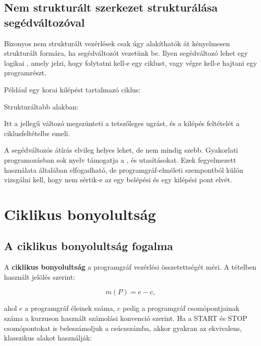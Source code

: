 \subsection{Nem strukturált szerkezet strukturálása segédváltozóval}

Bizonyos nem strukturált vezérlések csak úgy alakíthatók át kényelmesen strukturált formára, ha segédváltozót vezetünk be. Ilyen segédváltozó lehet egy logikai , amely jelzi, hogy folytatni kell-e egy ciklust, vagy végre kell-e hajtani egy programrészt.

Például egy korai kilépést tartalmazó ciklus:


Strukturáltabb alakban:


Itt a  jellegű  változó megszünteti a tetszőleges ugrást, és a kilépés feltételét a ciklusfeltételbe emeli.

\begin{warningbox}
A segédváltozós átírás elvileg helyes lehet, de nem mindig szebb. Gyakorlati programozásban sok nyelv támogatja a ,  és  utasításokat. Ezek fegyelmezett használata általában elfogadható, de programgráf-elméleti szempontból külön vizsgálni kell, hogy nem sértik-e az egy belépési és egy kilépési pont elvét.
\end{warningbox}

\section{Ciklikus bonyolultság}

\subsection{A ciklikus bonyolultság fogalma}

A \textbf{ciklikus bonyolultság} a programgráf vezérlési összetettségét méri. A tételben használt jelölés szerint:

\[
m(P)=e-c,
\]

ahol $e$ a programgráf éleinek száma, $c$ pedig a programgráf csomópontjainak száma a kurzuson használt számolási konvenció szerint. Ha a START és STOP csomópontokat is beleszámoljuk a csúcsszámba, akkor gyakran az ekvivalens, klasszikus alakot használják:

